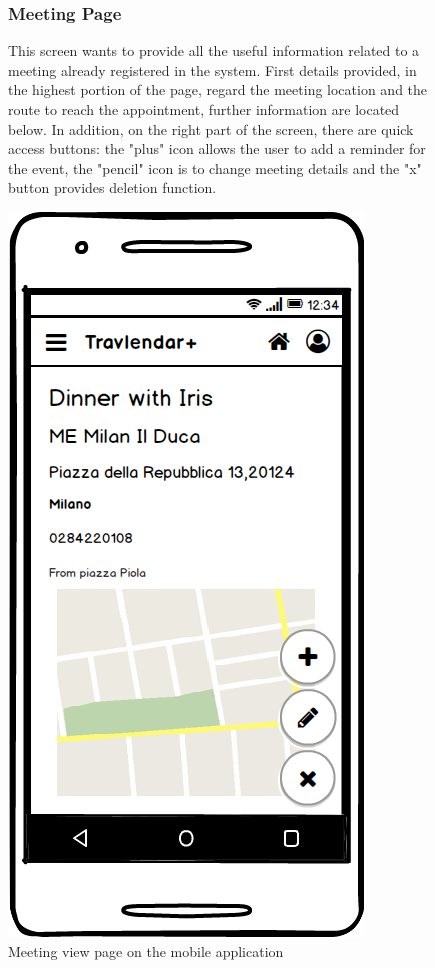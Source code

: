 	\begin{figure}

			\begin{flushleft}
			
			
			\subsubsection{Meeting Page}
			This screen wants to provide all the useful information related to a meeting already registered in the system. First details provided, in the highest portion of the page, regard the meeting location and the route to reach the appointment, further information are located below. In addition, on the right part of the screen, there are quick access buttons: the "plus" icon allows the user to add a reminder for the event, the "pencil" icon is to change meeting details and the "x" button provides deletion function. 
		\end{flushleft}
	\centering
	\includegraphics[width=0.6\linewidth]{mockups/MeetingView}
	\caption{Meeting view page on the mobile application}
	\label{fig:meeting-view}
	\end{figure}

